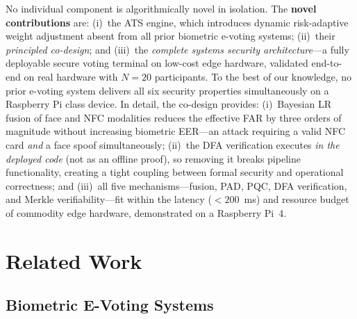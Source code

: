 \documentclass[conference]{IEEEtran}
\begin{document}
No individual component is algorithmically novel in isolation.
The \textbf{novel contributions} are: (i)~the ATS engine, which introduces
dynamic risk-adaptive weight adjustment absent from all prior biometric
e-voting systems; (ii)~their \emph{principled co-design}; and
(iii)~the \emph{complete systems security architecture}—a fully
deployable secure voting terminal on low-cost edge hardware,
validated end-to-end on real hardware with \(N{=}20\) participants.
To the best of our knowledge, no prior e-voting system delivers all six
security properties simultaneously on a Raspberry Pi class device. In detail, the
co-design provides:
(i)~Bayesian LR fusion of face and NFC modalities reduces the effective FAR
by three orders of magnitude without increasing biometric EER—an attack requiring
a valid NFC card \emph{and} a face spoof simultaneously;
(ii)~the DFA verification executes \emph{in the deployed code} (not as an
offline proof), so removing it breaks pipeline functionality, creating a tight
coupling between formal security and operational correctness;
and (iii)~all five mechanisms—fusion, PAD, PQC, DFA verification, and Merkle
verifiability—fit within the latency (\(<200\)~ms) and resource budget
of commodity edge hardware, demonstrated on a Raspberry Pi~4.

\section{Related Work}
\label{sec:related}

\subsection{Biometric E-Voting Systems}
\end{document}
